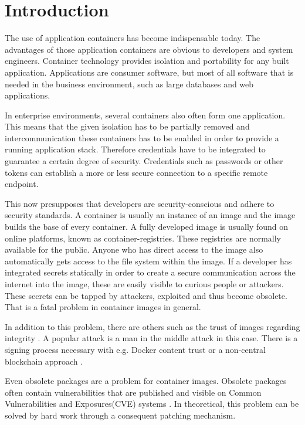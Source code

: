 \chapter{Introduction}
\label{ch:intro}

The use of application containers has become indispensable today. The advantages of those application containers are obvious to developers and system engineers. Container technology provides isolation and portability for any built application. Applications are consumer software, but most of all software that is needed in the business environment, such as large databases and web applications.

In enterprise environments, several containers also often form one application. This means that the given isolation has to be partially removed and intercommunication these containers has to be enabled in order to provide a running application stack. Therefore credentials have to be integrated to guarantee a certain degree of security. Credentials such as passwords or other tokens can establish a more or less secure connection to a specific remote endpoint. 

This now presupposes that developers are security-conscious and adhere to security standards. A container is usually an instance of an image and the image builds the base of every container. A fully developed image is usually found on online platforms, known as container-registries. These registries are normally available for the public. Anyone who has direct access to the image also automatically gets access to the file system within the image. If a developer has integrated secrets statically in order to create a secure communication across the internet into the image, these are easily visible to curious people or attackers. These secrets can be tapped by attackers, exploited and thus become obsolete. That is a fatal problem in container images in general.

In addition to this problem, there are others such as the trust of images regarding integrity \cite{to_docker_or_not}.
A popular attack is a man in the middle attack in this case. There is a signing process necessary with e.g. Docker content trust or a non-central blockchain approach \cite{Xu2018}. 

Even obsolete packages are a problem for container images. Obsolete packages often contain vulnerabilities that are published and visible on Common Vulnerabilities and Exposures(CVE) systems \cite{10.1007/978-3-319-94289-6_8}. In theoretical, this problem can be solved by hard work through a consequent patching mechanism. 

